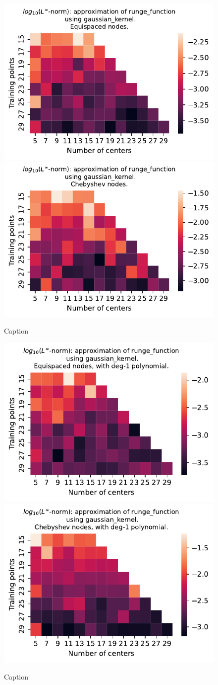 \documentclass[12pt]{report} %
\begin{document}
\begin{figure}[ht]
  \centering

  \includegraphics[width=.49\textwidth]{imagenes/experiments/1d/variational/runge_function-Kgaussian_kernel-Equi.pdf}
  \includegraphics[width=.49\textwidth]{imagenes/experiments/1d/variational/runge_function-Kgaussian_kernel-Cheb.pdf}
  \caption{Caption}
  \label{fig:runge-gaussian}
\end{figure}


\begin{figure}[ht]
  \centering

  \includegraphics[width=.49\textwidth]{imagenes/experiments/1d/variational/runge_function-Kgaussian_kernel-Poly-Equi.pdf}
  \includegraphics[width=.49\textwidth]{imagenes/experiments/1d/variational/runge_function-Kgaussian_kernel-Poly-Cheb.pdf}
  \caption{Caption}
  \label{fig:runge-gaussian-poly}
\end{figure}
\end{document}
